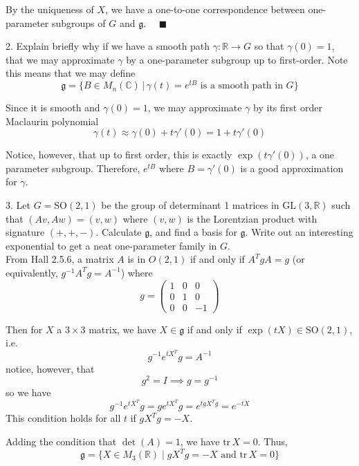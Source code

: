 \documentclass[11pt]{article}
\newcommand{\C}{\mathbb{C}}
\newcommand{\R}{\mathbb{R}}
\newcommand{\GL}{\text{GL}}
\newcommand{\SO}{\text{SO}}
\newcommand{\gf}{\mathfrak{g}}
\newcommand{\tr}{\text{tr}\,}
\newcommand{\qed}{\quad \blacksquare}
\begin{document}
		By the uniqueness of $X$, we have a one-to-one correspondence between one-parameter subgroups of $G$ and $\gf$. $\qed$
	\color{black}

\pagebreak

2.  Explain briefly why if we have a smooth path $\gamma : \R \to G$ so that $\gamma(0) = 1$, that we may approximate $\gamma$ by a one-parameter subgroup up to first-order.  Note this means that we may define 
\[\mathfrak{g} = \{B \in M_{n}(\C) \, | \, \gamma(t) = e^{tB} \text{ is a smooth path in }G\}\]

	\color{blue}
		Since it is smooth and $\gamma(0) = 1$, we may approximate $\gamma$ by its first order Maclaurin polynomial 
		\[\gamma(t) \approx \gamma(0) + t\gamma'(0) = 1 + t\gamma'(0)\] 

		Notice, however, that up to first order, this is exactly $\exp(t\gamma'(0))$, a one parameter subgroup. Therefore, $e^{tB}$ where $B = \gamma'(0)$ is a good approximation for $\gamma$. 
	\color{black}

\pagebreak	

3.  Let $G = \SO(2,1)$ be the group of determinant 1 matrices in $\GL(3,\R)$ such that $(Av,Aw) = (v,w)$ where $(v,w)$ is the Lorentzian product with signature $(+,+,-)$.  Calculate $\mathfrak{g}$, and find a basis for $\mathfrak{g}$.  Write out an interesting exponential to get a neat one-parameter family in $G$.\\
	
	\color{blue}
		From Hall 2.5.6, a matrix $A$ is in $O(2,1)$ if and only if $A^{T}gA = g$ (or equivalently, $g^{-1}A^Tg= A^{-1}$) where 
		\[g = \begin{pmatrix}
			1 & 0 & 0\\
			0 & 1 & 0\\
			0 & 0 & -1
		\end{pmatrix}\]

		Then for $X$ a $3\times 3$ matrix, we have $X \in \gf$ if and only if $\exp(tX) \in \SO(2,1)$, i.e. 
		\[g^{-1}e^{tX^T}g = A^{-1}\]
		notice, however, that 
		\[g^2 = I \implies g = g^{-1}\]
		so we have 
		\[g^{-1}e^{tX^T}g = ge^{tX^T}g = e^{tgX^Tg} = e^{-tX}\]
		This condition holds for all $t$ if $gX^Tg = -X$.

		Adding the condition that $\det(A) = 1$, we have $\tr X = 0$. Thus, 
		\[\gf = \{X \in M_3(\R) \; | \; gX^Tg = -X \text{ and } \tr X = 0\}\]
\end{document}
